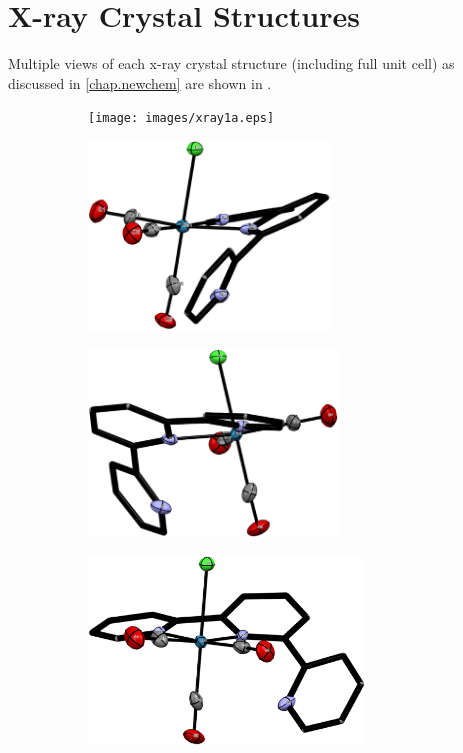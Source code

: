 \chapter{X-ray Crystal Structures} \label{app.xrays}

Multiple views of each x-ray crystal structure (including full unit cell) as discussed in \autoref{chap.newchem} are shown in . 

\begin{figure}[!ht]
 \centering
 \begin{subfigure}[b]{0.49\textwidth}
  \texttt{[image: images/xray1a.eps]}
 \end{subfigure}
 \begin{subfigure}[b]{0.49\textwidth}
  \includegraphics[clip=true, width=\textwidth, height=50mm, keepaspectratio]{images/xray1b.eps}
 \end{subfigure}
 \begin{subfigure}[b]{0.49\textwidth}
  \includegraphics[clip=true, width=\textwidth, height=50mm, keepaspectratio]{images/xray1c.eps}
 \end{subfigure}
  \begin{subfigure}[b]{0.49\textwidth}
  \includegraphics[clip=true, width=\textwidth, height=50mm, keepaspectratio]{images/xray1d.eps}

\end{subfigure}
\end{figure}
